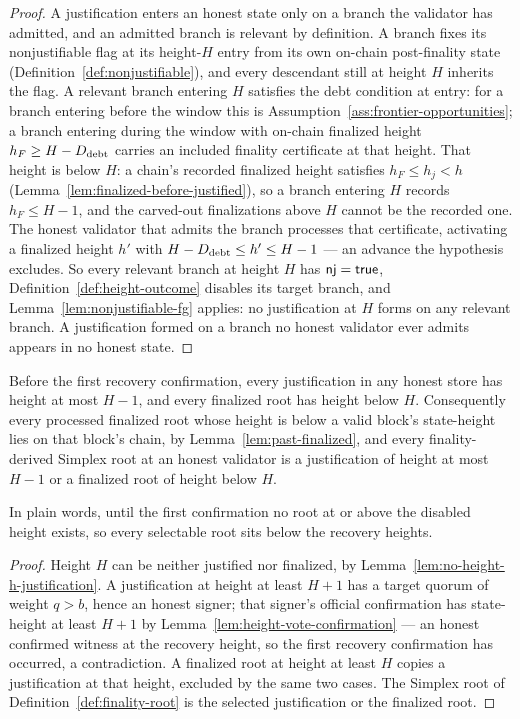\begin{proof}
A justification enters an honest state only on a branch the validator has
admitted, and an admitted branch is relevant by definition.  A branch
fixes its nonjustifiable flag at its height-\(H\) entry from its own
on-chain post-finality state (Definition~\ref{def:nonjustifiable}), and
every descendant still at height \(H\) inherits the flag.  A relevant
branch entering \(H\) satisfies the debt condition at entry: for a branch
entering before the window this is
Assumption~\ref{ass:frontier-opportunities}; a branch entering during
the window with on-chain finalized height \(h_F\geq H-D_{\rm debt}\)
carries an included finality certificate at that height.  That height
is below \(H\): a chain's recorded finalized height satisfies
\(h_F\leq h_j<h\) (Lemma~\ref{lem:finalized-before-justified}), so a
branch entering \(H\) records \(h_F\leq H-1\), and the carved-out
finalizations above \(H\) cannot be the recorded one.  The honest
validator that admits the branch processes that certificate, activating
a finalized height \(h'\) with
\(H-D_{\rm debt}\leq h'\leq H-1\) --- an advance the hypothesis
excludes.  So every relevant branch at height \(H\) has
\(\mathsf{nj}=\mathsf{true}\), Definition~\ref{def:height-outcome} disables its
target branch, and Lemma~\ref{lem:nonjustifiable-fg} applies: no
justification at \(H\) forms on any relevant branch.  A justification
formed on a branch no honest validator ever admits appears in no honest
state.
\end{proof}

\begin{lemma}
\label{lem:selectable-roots}
Before the first recovery confirmation, every justification in any
honest store has height at most \(H-1\), and every finalized root has
height below \(H\).  Consequently every processed finalized root whose
height is below a valid block's state-height lies on that block's chain,
by Lemma~\ref{lem:past-finalized}, and every finality-derived Simplex
root at an honest validator is a justification of height at most
\(H-1\) or a finalized root of height below \(H\).

In plain words, until the first confirmation no root at or above the
disabled height exists, so every selectable root sits below the recovery
heights.
\end{lemma}

\begin{proof}
Height \(H\) can be neither justified nor finalized, by
Lemma~\ref{lem:no-height-h-justification}.  A justification at height
at least \(H+1\) has a target quorum of weight \(q>b\), hence an
honest signer; that signer's official confirmation has state-height at
least \(H+1\) by Lemma~\ref{lem:height-vote-confirmation} --- an
honest confirmed witness at the recovery height, so the first recovery
confirmation has occurred, a contradiction.  A finalized root at height
at least \(H\) copies a justification at that height, excluded by the
same two cases.  The Simplex root of Definition~\ref{def:finality-root}
is the selected justification or the finalized root.
\end{proof}


